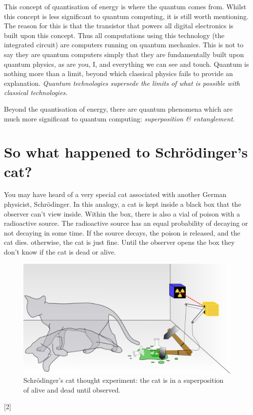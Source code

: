 \documentclass{book}
\begin{document}
This concept of quantisation of energy is where the quantum comes from. Whilst this concept is less significant to quantum computing, it is still worth mentioning. The reason for this is that the transistor that powers all digital electronics is built upon this concept. Thus all computations using this technology (the integrated circuit) are computers running on quantum mechanics. This is not to say they are quantum computers simply that they are fundamentally built upon quantum physics, as are you, I, and everything we can see and touch. Quantum is nothing more than a limit, beyond which classical physics fails to provide an explanation. \textit{Quantum technologies supersede the limits of what is possible with classical technologies.}

Beyond the quantisation of energy, there are quantum phenomena which are much more significant to quantum computing: \textit{superposition \& entanglement}. 

\section{So what happened to Schrödinger’s cat?}

You may have heard of a very special cat associated with another German physicist, Schrödinger. In this analogy, a cat is kept inside a black box that the observer can't view inside. Within the box, there is also a vial of poison with a radioactive source. The radioactive source has an equal probability of decaying or not decaying in some time. If the source decays, the poison is released, and the cat dies. otherwise, the cat is just fine. Until the observer opens the box they don't know if the cat is dead or alive. 

\begin{figure}[ht!]
    \centering
    \includegraphics[scale=0.4]{images/standard_cat.png}
    \caption{Schrödinger's cat thought experiment: the cat is in a superposition of alive and dead until observed.}
    \label{fig:schrodinger_cat}
\end{figure}
[2]
\end{document}
